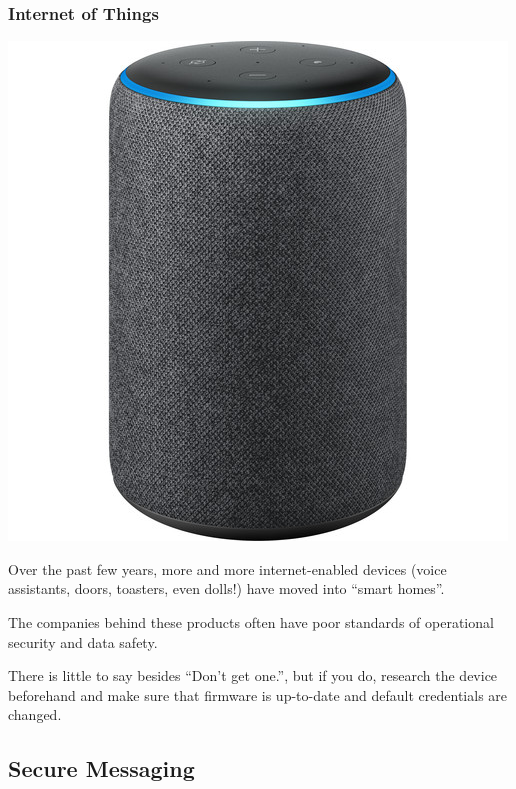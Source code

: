 \documentclass[aspectratio=169,dvipsnames]{beamer}
\begin{document}
\begin{frame}
\frametitle{Internet of Things}

\begin{minipage}{0.4\textwidth}
\begin{center}
\includegraphics[scale=0.25,keepaspectratio]{images/alexa}
\end{center}
\end{minipage}%
\begin{minipage}{0.6\textwidth}
Over the past few years, more and more internet-enabled devices (voice assistants, doors, toasters, even dolls!) have moved into ``smart homes''.
\pause\medskip

The companies behind these products often have poor standards of operational security and data safety. 
\pause\medskip

There is little to say besides ``Don't get one.'', but if you do, research the device beforehand and make sure that firmware is up-to-date and default credentials are changed.
\end{minipage}
\end{frame}

\subsection{Secure Messaging}
\end{document}
